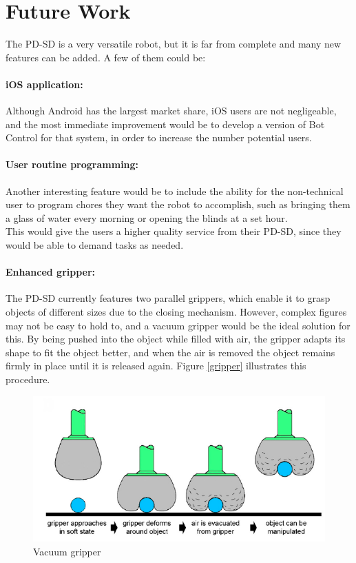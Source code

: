 \section{Future Work}

The PD-SD is a very versatile robot, but it is far from complete and many new features can be added. A few of them could be:

\paragraph{iOS application:} Although Android has the largest market share, iOS users are not negligeable, and the most immediate improvement would be to develop a version of Bot Control for that system, in order to increase the number potential users.

\paragraph{User routine programming:} Another interesting feature would be to include the ability for the non-technical user to program chores they want the robot to accomplish, such as bringing them a glass of water every morning or opening the blinds at a set hour. \\

This would give the users a higher quality service from their PD-SD, since they would be able to demand tasks as needed.



\paragraph{Enhanced gripper:}  The PD-SD currently features two parallel grippers, which enable it to grasp objects of different sizes due to the closing mechanism. However, complex figures may not be easy to hold to, and a vacuum gripper would be the ideal solution for this. By being pushed into the object while filled with air, the gripper adapts its shape to fit the object better, and when the air is removed the object remains firmly in place until it is released again. Figure \ref{gripper} illustrates this procedure.

	\begin{figure}[H]
			\centering
			\includegraphics[scale=0.7]{images/Conclusion/gripper.png}
			\caption{Vacuum gripper  }
			\label{ass1}
	\end{figure}
	\bigskip



